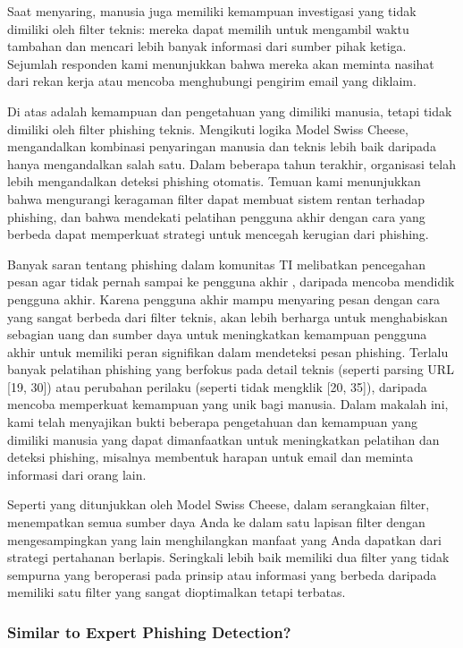 \documentclass[lettersize,journal]{IEEEtran}
\begin{document}
Saat menyaring, manusia juga memiliki kemampuan investigasi yang tidak dimiliki
oleh filter teknis: mereka dapat memilih untuk mengambil waktu tambahan dan
mencari lebih banyak informasi dari sumber pihak ketiga. Sejumlah responden
kami menunjukkan bahwa mereka akan meminta nasihat dari rekan kerja atau
mencoba menghubungi pengirim email yang diklaim.

Di atas adalah kemampuan dan pengetahuan yang dimiliki manusia, tetapi tidak
dimiliki oleh filter phishing teknis. Mengikuti logika Model Swiss Cheese,
mengandalkan kombinasi penyaringan manusia dan teknis lebih baik daripada hanya
mengandalkan salah satu. Dalam beberapa tahun terakhir, organisasi telah lebih
mengandalkan deteksi phishing otomatis. Temuan kami menunjukkan bahwa
mengurangi keragaman filter dapat membuat sistem rentan terhadap phishing, dan
bahwa mendekati pelatihan pengguna akhir dengan cara yang berbeda dapat
memperkuat strategi untuk mencegah kerugian dari phishing.

Banyak saran tentang phishing dalam komunitas TI melibatkan pencegahan pesan
agar tidak pernah sampai ke pengguna akhir \cite{satuempat}, daripada mencoba
mendidik pengguna akhir. Karena pengguna akhir mampu menyaring pesan dengan
cara yang sangat berbeda dari filter teknis, akan lebih berharga untuk
menghabiskan sebagian uang dan sumber daya untuk meningkatkan kemampuan
pengguna akhir untuk memiliki peran signifikan dalam mendeteksi pesan phishing.
Terlalu banyak pelatihan phishing yang berfokus pada detail teknis (seperti
parsing URL [19, 30]) atau perubahan perilaku (seperti tidak mengklik [20,
    35]), daripada mencoba memperkuat kemampuan yang unik bagi manusia. Dalam
makalah ini, kami telah menyajikan bukti beberapa pengetahuan dan kemampuan
yang dimiliki manusia yang dapat dimanfaatkan untuk meningkatkan pelatihan dan
deteksi phishing, misalnya membentuk harapan untuk email dan meminta informasi
dari orang lain.

Seperti yang ditunjukkan oleh Model Swiss Cheese, dalam serangkaian filter,
menempatkan semua sumber daya Anda ke dalam satu lapisan filter dengan
mengesampingkan yang lain menghilangkan manfaat yang Anda dapatkan dari
strategi pertahanan berlapis. Seringkali lebih baik memiliki dua filter yang
tidak sempurna yang beroperasi pada prinsip atau informasi yang berbeda
daripada memiliki satu filter yang sangat dioptimalkan tetapi terbatas.

\subsubsection{Similar to Expert Phishing Detection?}
\end{document}
